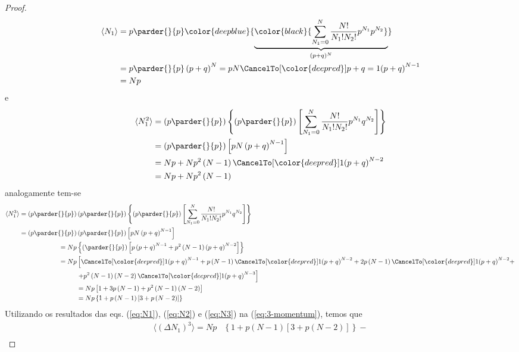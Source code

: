 \begin{prob}
\begin{sol}
\begin{proof}
\begin{align}
		\langle N_1\rangle & =p\parder{}{p}\color{deepblue}{\underbrace{
			\color{black}{\sum_{N_1=0}^N\frac{N!}{N_1!N_2!}p^{N_1}p^{N_2}}
		}_{(p+q)^N}} \nonumber  \\
 		&=p\parder{}{p}\left(p+q\right)^N=pN\CancelTo[\color{deepred}]{p+q=1}{\left(p+q\right)^{N-1}}\nonumber \\
         & =Np
	\end{align}
	e
	\begin{align}
		\label{eq:N2}\langle N_1^2\rangle &=\left(p\parder{}{p}\right)\left\{\left(p\parder{}{p}\right)\left[\sum_{N_1=0}^N\frac{N!}{N_1!N_2!}p^{N_1}q^{N_2}\right]\right\}\nonumber \\
        &=\left(p\parder{}{p}\right)\left[pN\left(p+q\right)^{N-1}\right]\nonumber \\
        &=Np+Np^2\left(N-1\right)\CancelTo[\color{deepred}]{1}{\left(p+q\right)^{N-2}}\nonumber \\
        & =Np+Np^2\left(N-1\right)
	\end{align}
	analogamente tem-se
	\begin{align}
		\label{eq:N3}\langle N_1^3\rangle=\left(p\parder{}{p}\right)&\left(p\parder{}{p}\right)\left\{\left(p\parder{}{p}\right)\left[\sum_{N_1=0}^N\frac{N!}{N_1!N_2!}p^{N_1}q^{N_2}\right]\right\}\nonumber  \\
		=\left(p\parder{}{p}\right)&\left(p\parder{}{p}\right)\left[pN\left(p+q\right)^{N-1}\right]\nonumber \\
		=Np&\left\{\left(\parder{}{p}\right)\left[p\left(p+q\right)^{N-1}+p^2\left(N-1\right)\left(p+q\right)^{N-2}\right]\right\}\nonumber \\
		=Np&\left[\CancelTo[\color{deepred}]{1}{\left(p+q\right)^{N-1}}+p\left(N-1\right)\CancelTo[\color{deepred}]{1}{\left(p+q\right)^{N-2}}+2p\left(N-1\right)\CancelTo[\color{deepred}]{1}{\left(p+q\right)^{N-2}}+\right.\nonumber \\
        &\left.+p^2\left(N-1\right)\left(N-2\right)\CancelTo[\color{deepred}]{1}{\left(p+q\right)^{N-3}}\right]\nonumber \\
        &=Np\left[1+3p\left(N-1\right)+p^2\left(N-1\right)\left(N-2\right)\right]\nonumber \\
        &=Np\left\{1+p\left(N-1\right)\left[3+p\left(N-2\right)\right]\right\}
	\end{align}
	Utilizando os resultados das eqs. (\ref{eq:N1}), (\ref{eq:N2}) e (\ref{eq:N3}) na (\ref{eq:3-momentum}), temos que
	\begin{align}
		\langle\left(\Delta N_1\right)^3\rangle=Np&\left\{1+p\left(N-1\right)\left[3+p\left(N-2\right)\right]\right\}-\nonumber \\

\end{align}
\end{proof}
\end{sol}
\end{prob}
